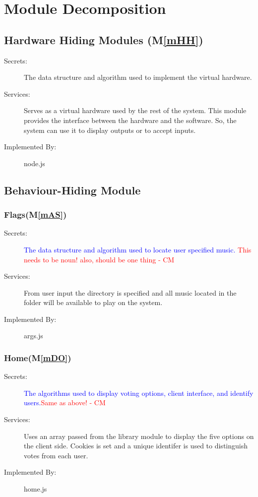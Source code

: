 \documentclass[12pt, titlepage]{article}
\newcommand{\mref}[1]{M\ref{#1}}
\begin{document}
\section{Module Decomposition} \label{SecMD}


\subsection{Hardware Hiding Modules (\mref{mHH})}


\begin{description}
\item[Secrets:]The data structure and algorithm used to implement the virtual
 hardware.
\item[Services:]Serves as a virtual hardware used by the rest of the
 system. This module provides the interface between the hardware and the
 software. So, the system can use it to display outputs or to accept inputs.
\item[Implemented By:] node.js
\end{description}


\subsection{Behaviour-Hiding Module}

\subsubsection{Flags(\mref{mAS})}


\begin{description}
\item[Secrets:]\textcolor{blue}{The data structure and algorithm used to locate user specified music.} \textcolor{red}{This needs to be noun! also, should be one thing - CM}
\item[Services:]From user input the directory is specified and all music located in the folder will be available to play on the system.
\item[Implemented By:] args.js
\end{description}

\subsubsection{Home(\mref{mDO})}


\begin{description}
\item[Secrets:]\textcolor{blue}{The algorithms used to display voting options, client interface, and identify users.}\textcolor{red}{Same as above! - CM}
\item[Services:]Uses an array passed from the library module to display the five options on the client side. Cookies is set and a unique identifer is used to distinguish votes from each user.
\item[Implemented By:] home.js
\end{description}
\end{document}
